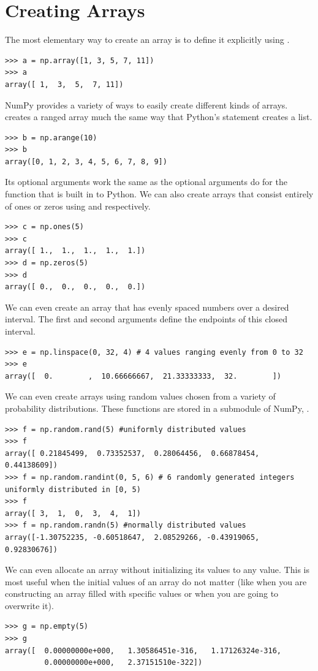 \section*{Creating Arrays}
The most elementary way to create an array is to define it explicitly using .
\begin{lstlisting}
>>> a = np.array([1, 3, 5, 7, 11])
>>> a
array([ 1,  3,  5,  7, 11])
\end{lstlisting}
NumPy provides a variety of ways to easily create different kinds of arrays.
 creates a ranged array much the same way that Python's  statement creates a list.
\begin{lstlisting}
>>> b = np.arange(10)
>>> b
array([0, 1, 2, 3, 4, 5, 6, 7, 8, 9])
\end{lstlisting}
Its optional arguments work the same as the optional arguments do for the  function that is built in to Python.
We can also create arrays that consist entirely of ones or zeros using  and  respectively.
\begin{lstlisting}
>>> c = np.ones(5)
>>> c
array([ 1.,  1.,  1.,  1.,  1.])
>>> d = np.zeros(5)
>>> d
array([ 0.,  0.,  0.,  0.,  0.])
\end{lstlisting}
We can even create an array that has evenly spaced numbers over a desired interval.
The first and second arguments define the endpoints of this closed interval.
\begin{lstlisting}
>>> e = np.linspace(0, 32, 4) # 4 values ranging evenly from 0 to 32
>>> e
array([  0.        ,  10.66666667,  21.33333333,  32.        ])
\end{lstlisting}
We can even create arrays using random values chosen from a variety of probability distributions.
These functions are stored in a submodule of NumPy, .
\begin{lstlisting}
>>> f = np.random.rand(5) #uniformly distributed values
>>> f
array([ 0.21845499,  0.73352537,  0.28064456,  0.66878454,  0.44138609])
>>> f = np.random.randint(0, 5, 6) # 6 randomly generated integers uniformly distributed in [0, 5)
>>> f
array([ 3,  1,  0,  3,  4,  1])
>>> f = np.random.randn(5) #normally distributed values
array([-1.30752235, -0.60518647,  2.08529266, -0.43919065,  0.92830676])
\end{lstlisting}
We can even allocate an array without initializing its values to any value.
This is most useful when the initial values of an array do not matter (like when you are constructing an array filled with specific values or when you are going to overwrite it).
\begin{lstlisting}
>>> g = np.empty(5)
>>> g
array([  0.00000000e+000,   1.30586451e-316,   1.17126324e-316,
         0.00000000e+000,   2.37151510e-322])
\end{lstlisting}

